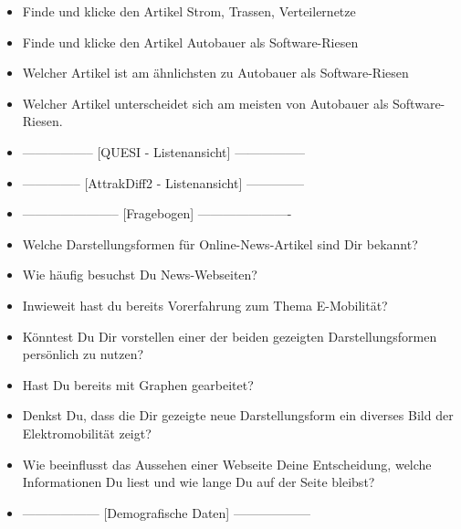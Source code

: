 {\begin{itemize}[]
        \item {} Finde und klicke den Artikel \flqq Strom, Trassen, Verteilernetze\frqq{}
        \item {} Finde und klicke den Artikel \flqq Autobauer als Software-Riesen\frqq{}
        \item {} Welcher Artikel ist am ähnlichsten zu \flqq Autobauer als Software-Riesen\frqq{}
        \item {} Welcher Artikel unterscheidet sich am meisten von \flqq Autobauer als Software-Riesen\frqq{}.
        \item {-----------------} [QUESI - Listenansicht] {-----------------}
        \item {--------------} [AttrakDiff2 - Listenansicht] {--------------}
        \item {-----------------------} [Fragebogen] {----------------------}
        \item {} Welche Darstellungsformen für Online-News-Artikel sind Dir bekannt?
        \item {} Wie häufig besuchst Du News-Webseiten?
        \item {} Inwieweit hast du bereits Vorerfahrung zum Thema E-Mobilität?
        \item {} Könntest Du Dir vorstellen einer der beiden gezeigten Darstellungsformen persönlich zu nutzen?
        \item {} Hast Du bereits mit Graphen gearbeitet?
        \item {} Denkst Du, dass die Dir gezeigte neue Darstellungsform ein diverses Bild der Elektromobilität zeigt?
        \item {} Wie beeinflusst das Aussehen einer Webseite Deine Entscheidung, welche Informationen Du liest und wie lange Du auf der Seite bleibst?
        \item {------------------} [Demografische Daten] {------------------}
    \end{itemize}}
\nolinenumbers
